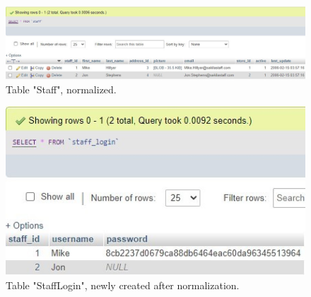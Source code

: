 \documentclass{article}
\begin{document}
		\begin{figure}[H]
			\includegraphics[width=\textwidth]{table_staff_norm}
			\caption{Table "Staff", normalized.}
		\end{figure}
		\begin{figure}[H]
			\includegraphics[width=\textwidth]{table_stafflogin_norm}
			\caption{Table "Staff\textunderscore Login", newly created after normalization.}
		\end{figure}
\end{document}

